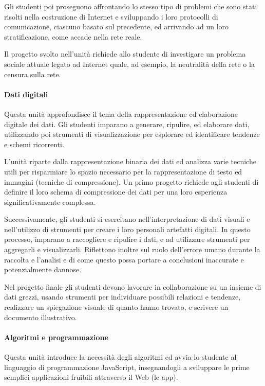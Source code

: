 \documentclass[11pt,a4paper]{article}
\begin{document}
Gli studenti poi proseguono affrontando lo stesso tipo di problemi che
sono stati risolti nella costruzione di Internet e sviluppando i loro
protocolli di comunicazione, ciascuno basato sul precedente, ed
arrivando ad un loro stratificazione, come accade nella rete reale.

Il progetto svolto nell'unità richiede allo studente di investigare un
problema sociale attuale legato ad Internet quale, ad esempio, la
neutralità della rete o la censura sulla rete.

\paragraph{Dati digitali}
Questa unità approfondisce il tema della rappresentazione ed
elaborazione digitale dei dati. Gli studenti imparano a generare,
ripulire, ed elaborare dati, utilizzando poi strumenti di
visualizzazione per esplorare ed identificare tendenze e schemi
ricorrenti.

L'unità riparte dalla rappresentazione binaria dei dati ed analizza
varie tecniche utili per risparmiare lo spazio necessario per la
rappresentazione di testo ed immagini (tecniche di compressione). Un
primo progetto richiede agli studenti di definire il loro schema di
compressione dei dati per una loro esperienza significativamente
complessa.

Successivamente, gli studenti si esercitano nell'interpretazione di
dati visuali e nell'utilizzo di strumenti per creare i loro personali
artefatti digitali. In questo processo, imparano a raccogliere e
ripulire i dati, e ad utilizzare strumenti per aggregarli e
visualizzarli. Riflettono inoltre sul ruolo dell'errore umano durante
la raccolta e l'analisi e di come questo possa portare a conclusioni
inaccurate e potenzialmente dannose.

Nel progetto finale gli studenti devono lavorare in collaborazione su
un insieme di dati grezzi, usando strumenti per individuare possibili
relazioni e tendenze, realizzare un spiegazione visuale di quanto
hanno trovato, e scrivere un documento illustrativo.

\paragraph{Algoritmi e programmazione}

Questa unità introduce la necessità degli algoritmi ed avvia lo
studente al linguaggio di programmazione JavaScript, insegnandogli a
sviluppare le prime semplici applicazioni fruibili attraverso il Web
(le app).
\end{document}
